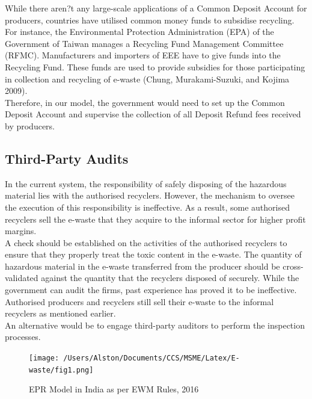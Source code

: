 \documentclass[a4paper, 12pt]{article}
\begin{document}
                    While there aren?t any large-scale applications of a Common Deposit Account for producers, countries have utilised common money funds to subsidise recycling. For instance, the Environmental Protection Administration (EPA) of the Government of Taiwan manages a Recycling Fund Management Committee (RFMC). Manufacturers and importers of EEE have to give funds into the Recycling Fund. These funds are used to provide subsidies for those participating in collection and recycling of e-waste (Chung, Murakami-Suzuki, and Kojima 2009). \\
                    
                    Therefore, in our model, the government would need to set up the Common Deposit Account and supervise the collection of all Deposit Refund fees received by producers. \\
                    
                    \subsection{Third-Party Audits}
                    
                    In the current system, the responsibility of safely disposing of the hazardous material lies with the authorised recyclers. However, the mechanism to oversee the execution of this responsibility is ineffective. As a result, some authorised recyclers sell the e-waste that they acquire to the informal sector for higher profit margins.\\
                    
                    A check should be established on the activities of the authorised recyclers to ensure that they properly treat the toxic content in the e-waste. The quantity of hazardous material in the e-waste transferred from the producer should be cross-validated against the quantity that the recyclers disposed of securely. While the government can audit the firms, past experience has proved it to be ineffective. Authorised producers and recyclers still sell their e-waste to the informal recyclers as mentioned earlier.\\
                     
                    An alternative would be to engage third-party auditors to perform the inspection processes.\\
                    
                     
                    \begin{figure}[H]
                    	\centering
                    	\texttt{[image: /Users/Alston/Documents/CCS/MSME/Latex/E-waste/fig1.png]}
                    	\caption[Optional Caption]{EPR Model in India as per EWM Rules, 2016}
                    \end{figure}
                    
\end{document}
